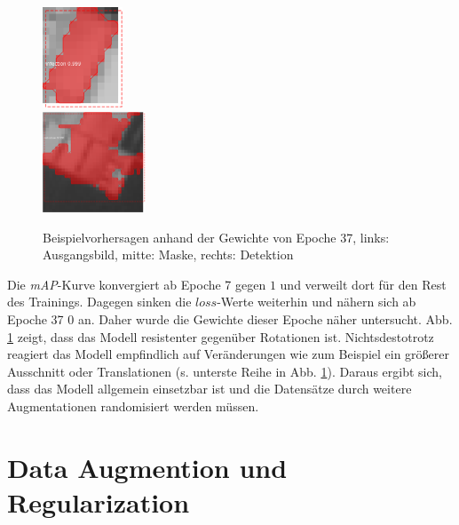\begin{figure}[ht]
\begin{minipage}[c]{.3\textwidth}
  \\ \vspace{.25cm}
  \includegraphics[height=3cm]{pics/pred-2-3.png}
  \\ \vspace{.25cm}
  \includegraphics[height=3cm]{pics/pred-2-4.png}
  \end{minipage}

  \caption[Beispielvorhersagen Experiment 2]{Beispielvorhersagen anhand der Gewichte von Epoche 37, links: Ausgangsbild, mitte: Maske, rechts: Detektion}
  \label{fig:pred-2}
\end{figure}
\noindent
Die \textit{mAP}-Kurve konvergiert ab Epoche 7 gegen $1$ und verweilt dort für den Rest des Trainings. Dagegen sinken die $loss$-Werte weiterhin und nähern sich ab Epoche 37 $0$ an. Daher wurde die Gewichte dieser Epoche näher untersucht. Abb. \ref{fig:pred-2} zeigt, dass das Modell resistenter gegenüber Rotationen ist. Nichtsdestotrotz reagiert das Modell empfindlich auf Veränderungen wie zum Beispiel ein größerer Ausschnitt oder Translationen (s. unterste Reihe in Abb. \ref{fig:pred-2}). Daraus ergibt sich, dass das Modell allgemein einsetzbar ist und die Datensätze durch weitere Augmentationen randomisiert werden müssen.
\newpage
\section{Data Augmention und Regularization}


